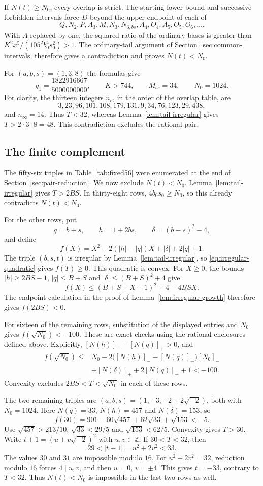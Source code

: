\documentclass[12pt]{article}
\numberwithin{equation}{section}
\begin{document}
If $N(t)\ge N_0$, every overlap is strict. The starting lower bound
and successive forbidden intervals force $D$ beyond the upper endpoint
of each of
\[
 Q,N_2,P,A_3,M,N_3,N_{3,bs},A_4,O_4,A_5,O_5,O_6,\ldots.
\]
With $A$ replaced by one, the squared ratio of the ordinary bases
is greater than $K^2x^5/(105^2b_0^4s_0^2)>1$.
The ordinary-tail argument of Section~\ref{sec:common-intervals}
therefore gives a contradiction and proves $N(t)<N_0$.

For $(a,b,s)=(1,3,8)$ the formulas give
\[
 q_1=\frac{1822916667}{5000000000},\qquad K>744,\qquad
 M_{bs}=34,\qquad N_0=1024.
\]
For clarity, the thirteen integers $n_e$, in the order of the overlap
table, are
\[
 3,23,96,101,108,179,131,9,34,76,123,29,438,
\]
and $n_\infty=14$. Thus $T<32$, whereas
Lemma~\ref{lem:tail-irregular} gives $T>2\cdot3\cdot8=48$.
This contradiction excludes the rational pair.

\subsection{The finite complement}

The fifty-six triples in Table~\ref{tab:fixed56} were enumerated at the
end of Section~\ref{sec:pair-reduction}. We now exclude $N(t)<N_0$.
Lemma~\ref{lem:tail-irregular} gives $T>2BS$. In thirty-eight rows,
$4b_0s_0\ge N_0$, so this already contradicts $N(t)<N_0$.

For the other rows, put
\[
 q=b+s,\qquad h=1+2bs,\qquad \delta=(b-s)^2-4,
\]
and define
\[
 f(X)=X^2-2(|h|-|q|)X+|\delta|+2|q|+1.
\]
The triple $(b,s,t)$ is irregular by Lemma~\ref{lem:tail-irregular},
so \eqref{eq:irregular-quadratic} gives $f(T)\ge0$.
This quadratic is convex. For $X\ge0$, the bounds
$|h|\ge2BS-1$, $|q|\le B+S$ and
$|\delta|\le(B+S)^2+4$ give
\[
 f(X)\le(B+S+X+1)^2+4-4BSX.
\]
The endpoint calculation in the proof of
Lemma~\ref{lem:irregular-growth} therefore gives $f(2BS)<0$.

For sixteen of the remaining rows, substitution of the displayed
entries and $N_0$ gives $f(\sqrt{N_0})<-100$. These are exact checks
using the rational enclosures defined above. Explicitly,
$[N(h)]_--[N(q)]_+>0$, and
\[
 \begin{split}
 f(\sqrt{N_0})\le{}&N_0
 -2\bigl([N(h)]_--[N(q)]_+\bigr)[N_0]_-\\
 &+[N(\delta)]_++2[N(q)]_++1<-100.
 \end{split}
\]
Convexity excludes $2BS<T<\sqrt{N_0}$ in each of these rows.

The two remaining triples are
$(a,b,s)=(1,-3,-2\pm2\sqrt{-2})$, both with $N_0=1024$.
Here $N(q)=33$, $N(h)=457$ and $N(\delta)=153$, so
\[
 f(30)=901-60\sqrt{457}+62\sqrt{33}+\sqrt{153}<-5.
\]
Use $\sqrt{457}>213/10$, $\sqrt{33}<29/5$ and
$\sqrt{153}<62/5$. Convexity gives $T>30$.
Write $t+1=(u+v\sqrt{-2})^2$ with $u,v\in\mathbb Z$.
If $30<T<32$, then
\[
 29<|t+1|=u^2+2v^2<33.
\]
The values $30$ and $31$ are impossible modulo $16$.
For $u^2+2v^2=32$, reduction modulo $16$ forces $4\mid u,v$,
and then $u=0$, $v=\pm4$. This gives $t=-33$, contrary to $T<32$.
Thus $N(t)<N_0$ is impossible in the last two rows as well.
\end{document}

